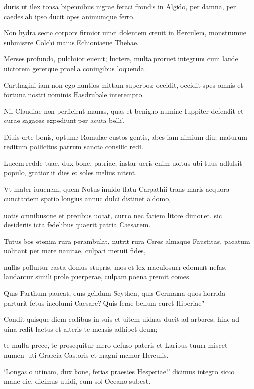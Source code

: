 \documentclass{book}
\newenvironment {carmen} [1] [\relax] 
  {\Titulus \Versus \incipit*\numerus{1}#1}
  {\endVersus}
\newcommand {\Alcaic}    {\Forma \strophae {0 \poena 01 \poena 2}}
\newcommand {\AsclA}     {\Forma \strophae {0 \poena 00 \poena 2}}
\begin{document}
\begin{carmen}[\Alcaic]
duris ut ilex tonsa bipennibus
 nigrae feraci frondis in Algido,
      per damna, per caedes ab ipso
      ducit opes animumque ferro.               
 
Non hydra secto corpore firmior
 uinci dolentem creuit in Herculem,
      monstrumue submisere Colchi
      maius Echioniaeue Thebae.
 
Merses profundo, pulchrior euenit;               
 luctere, multa proruet integrum
      cum laude uictorem geretque
      proelia coniugibus loquenda.
 
Carthagini iam non ego nuntios
 mittam superbos; occidit, occidit               
      spes omnis et fortuna nostri
      nominis Hasdrubale interempto.
 
Nil Claudiae non perficient manus,
 quas et benigno numine Iuppiter
      defendit et curae sagaces               
      expediunt per acuta belli'.
 

\end{carmen}

\begin{carmen}[\AsclA]


Diuis orte bonis, optume Romulae
 custos gentis, abes iam nimium diu;
 maturum reditum pollicitus patrum
      sancto consilio redi.
 
Lucem redde tuae, dux bone, patriae;               
 instar ueris enim uoltus ubi tuus
 adfulsit populo, gratior it dies
      et soles melius nitent.
 
Vt mater iuuenem, quem Notus inuido
 flatu Carpathii trans maris aequora               
 cunctantem spatio longius annuo
      dulci distinet a domo,
 
uotis omnibusque et precibus uocat,
 curuo nec faciem litore dimouet,
 sic desideriis icta fedelibus               
      quaerit patria Caesarem.
 
Tutus bos etenim rura perambulat,
 nutrit rura Ceres almaque Faustitas,
 pacatum uolitant per mare nauitae,
      culpari metuit fides,               
 
nullis polluitur casta domus stupris,
 mos et lex maculosum edomuit nefas,
 laudantur simili prole puerperae,
      culpam poena premit comes.
 
Quis Parthum paueat, quis gelidum Scythen,               
 quis Germania quos horrida parturit
 fetus incolumi Caesare? Quis ferae
      bellum curet Hiberiae?
 
Condit quisque diem collibus in suis
 et uitem uiduas ducit ad arbores;               
 hinc ad uina redit laetus et alteris
      te mensis adhibet deum;
 
te multa prece, te prosequitur mero
 defuso pateris et Laribus tuum
 miscet numen, uti Graecia Castoris               
      et magni memor Herculis.
 
`Longas o utinam, dux bone, ferias
 praestes Hesperiae!' dicimus integro
 sicco mane die, dicimus uuidi,
      cum sol Oceano subest.               
 

\end{carmen}
\end{document}
